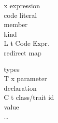 \noindent
\begin{minipage}{0.65\textwidth}
\begin{bnf}
\hline
{}      {x \mmid{}  \mmid{}  \mmid{}  \mmid{} }{expression}\\      {}        {code literal}\\      { \mmid{} }                                                    {member}\\      { \mmid{}  \mmid{} \Txs}                                          {kind}\\      {L \mmid{} t \mmid{}  \mmid{} }           {Code Expr.}%
\\      {\ddd{}}                    {redirect map}\\\hline
\end{bnf}
\end{minipage}
\begin{minipage}[t]{0.5\textwidth}
\begin{bnf}
\hline
{}      {}                                                 {types}\\\production{%
\Tx}     {T x}                                                              {parameter}\\      {}                                                         {declaration}\\     {C \mmid{} t}                                                      {class/trait id}\\      {}                                                 {value}\\      {\ldots}{}                                                
\\\hline
\end{bnf}
\end{minipage}

